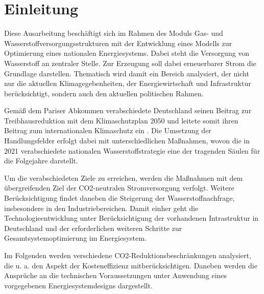 \section{Einleitung}

Diese Ausarbeitung beschäftigt sich im Rahmen des Moduls Gas- und Wasserstoffversorgungsstrukturen mit der Entwicklung eines Modells zur Optimierung eines nationalen Energiesystems. Dabei steht die Versorgung von Wasserstoff an zentraler Stelle. Zur Erzeugung soll dabei erneuerbarer Strom die Grundlage darstellen. Thematisch wird damit ein Bereich analysiert, der nicht nur die aktuellen Klimagegebenheiten, der Energiewirtschaft und Infrastruktur berücksichtigt, sondern auch den aktuellen politischen Rahmen.   

Gemäß dem Pariser Abkommen verabschiedete Deutschland seinen Beitrag zur Treibhausreduktion mit dem Klimaschutzplan 2050 und leitete somit ihren Beitrag zum internationalen Klimaschutz ein . 
Die Umsetzung der Handlungsfelder erfolgt dabei mit unterschiedlichen Maßnahmen, wovon die in 2021 verabschiedete nationalen Wasserstoffstrategie eine der tragenden Säulen für die Folgejahre darstellt.  

Um die verabschiedeten Ziele zu erreichen, werden die Maßnahmen mit dem übergreifenden Ziel der CO2-neutralen Stromversorgung verfolgt. Weitere Berücksichtigung findet daneben die Steigerung der Wasserstoffnachfrage, insbesondere in den Industriebereichen. Damit einher geht die Technologieentwicklung unter Berücksichtigung der vorhandenen Intrastruktur in Deutschland und der erforderlichen weiteren Schritte zur Gesamtsystemoptimierung im Energiesystem. 

Im Folgenden werden verschiedene CO2-Reduktionsbeschränkungen analysiert, die u. a. den Aspekt der Kosteneffizienz mitberücksichtigen. Daneben werden die Ansprüche an die technischen Voraussetzungen unter Anwendung eines vorgegebenen Energiesystemdesigns dargestellt.

